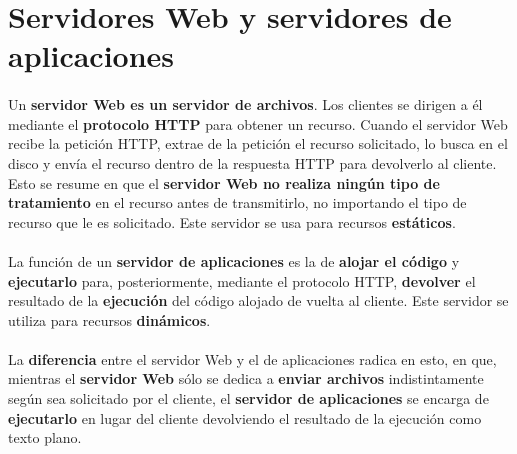 \documentclass{article}
\begin{document}
	\section{Servidores Web y servidores de aplicaciones}
	
	\paragraph{}Un \textbf{servidor Web es un servidor de archivos}. Los clientes se dirigen a él mediante el \textbf{protocolo HTTP} para obtener un recurso. Cuando el servidor Web recibe la petición HTTP, extrae de la petición el recurso solicitado, lo busca en el disco y envía el recurso dentro de la respuesta HTTP para devolverlo al cliente. Esto se resume en que el \textbf{servidor Web no realiza ningún tipo de tratamiento} en el recurso antes de transmitirlo, no importando el tipo de recurso que le es solicitado.
	Este servidor se usa para recursos \textbf{estáticos}.
	\\
	\\
	La función de un \textbf{servidor de aplicaciones} es la de \textbf{alojar el código} y \textbf{ejecutarlo} para, posteriormente, mediante el protocolo HTTP, \textbf{devolver} el resultado de la \textbf{ejecución} del código alojado de vuelta al cliente. Este servidor se utiliza para recursos \textbf{dinámicos}.
	\\
	\\
	La \textbf{diferencia} entre el servidor Web y el de aplicaciones radica en esto, en que, mientras el \textbf{servidor Web} sólo se dedica a \textbf{enviar archivos} indistintamente según sea solicitado por el cliente, el \textbf{servidor de aplicaciones} se encarga de \textbf{ejecutarlo} en lugar del cliente devolviendo el resultado de la ejecución como texto plano.
	
\end{document}

